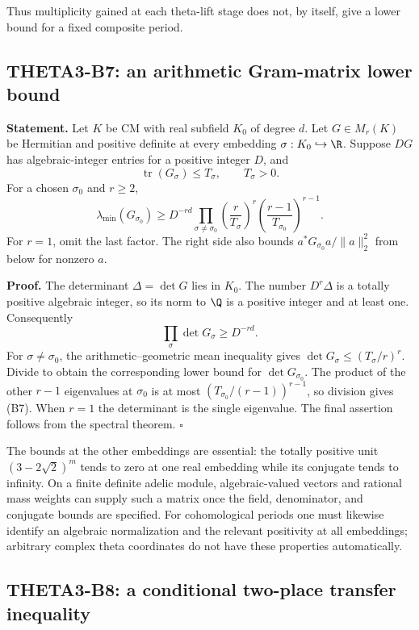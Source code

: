 Thus multiplicity gained at each theta-lift stage does not, by itself, give a lower bound for a fixed composite period.

\subsection{THETA3-B7: an arithmetic Gram-matrix lower bound}\label{B7}

\textbf{Statement.} Let $K$ be CM with real subfield $K_0$ of degree $d$. Let $G\in M_r(K)$ be Hermitian and positive definite at every embedding $\sigma:K_0\hookrightarrow\R$. Suppose $DG$ has algebraic-integer entries for a positive integer $D$, and
\[
 \operatorname{tr}(G_\sigma)\leq T_\sigma,\qquad T_\sigma>0.
\]
For a chosen $\sigma_0$ and $r\geq2$,
\[
 \lambda_{\min}(G_{\sigma_0})\geq
 D^{-rd}\prod_{\sigma\ne\sigma_0}\left(\frac r{T_\sigma}\right)^r
       \left(\frac{r-1}{T_{\sigma_0}}\right)^{r-1}.
 \tag{B7}
\]
For $r=1$, omit the last factor. The right side also bounds
$a^*G_{\sigma_0}a/\|a\|_2^2$ from below for nonzero $a$.

\textbf{Proof.} The determinant $\Delta=\det G$ lies in $K_0$. The number $D^r\Delta$ is a totally positive algebraic integer, so its norm to $\Q$ is a positive integer and at least one. Consequently
\[
 \prod_\sigma\det G_\sigma\geq D^{-rd}.
\]
For $\sigma\ne\sigma_0$, the arithmetic--geometric mean inequality gives
$\det G_\sigma\leq(T_\sigma/r)^r$. Divide to obtain the corresponding lower bound for $\det G_{\sigma_0}$. The product of the other $r-1$ eigenvalues at $\sigma_0$ is at most $(T_{\sigma_0}/(r-1))^{r-1}$, so division gives (B7). When $r=1$ the determinant is the single eigenvalue. The final assertion follows from the spectral theorem. \hfill$\square$

The bounds at the other embeddings are essential: the totally positive unit $(3-2\sqrt2)^m$ tends to zero at one real embedding while its conjugate tends to infinity. On a finite definite adelic module, algebraic-valued vectors and rational mass weights can supply such a matrix once the field, denominator, and conjugate bounds are specified. For cohomological periods one must likewise identify an algebraic normalization and the relevant positivity at all embeddings; arbitrary complex theta coordinates do not have these properties automatically.

\subsection{THETA3-B8: a conditional two-place transfer inequality}\label{B8}

